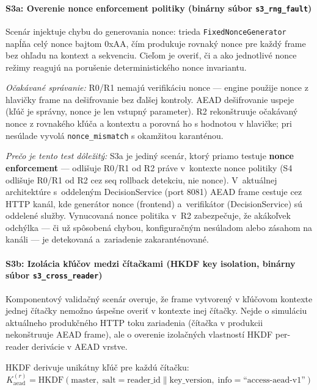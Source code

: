 \paragraph{S3a: Overenie nonce enforcement politiky (binárny súbor \texttt{s3\_rng\_fault})}

Scenár injektuje chybu do generovania nonce: trieda \texttt{FixedNonceGenerator} napĺňa celý nonce bajtom 0xAA, čím produkuje rovnaký nonce pre každý frame bez ohľadu na kontext a sekvenciu. Cieľom je overiť, či a ako jednotlivé nonce režimy reagujú na porušenie deterministického nonce invariantu.

\textit{Očakávané správanie:} R0/R1 nemajú verifikáciu nonce --- engine použije nonce z hlavičky frame na dešifrovanie bez ďalšej kontroly. AEAD dešifrovanie uspeje (kľúč je správny, nonce je len vstupný parameter). R2 rekonštruuje očakávaný nonce z rovnakého kľúča a kontextu a porovná ho s hodnotou v hlavičke; pri nesúlade vyvolá \texttt{nonce\_mismatch} s okamžitou karanténou.

\textit{Prečo je tento test dôležitý:} S3a je jediný scenár, ktorý priamo testuje \textbf{nonce enforcement} --- odlišuje R0/R1 od R2 práve v~kontexte nonce politiky (S4 odlišuje R0/R1 od R2 cez seq rollback detekciu, nie nonce). V~aktuálnej architektúre s~oddeleným DecisionService (port 8081) AEAD frame cestuje cez HTTP kanál, kde generátor nonce (frontend) a~verifikátor (DecisionService) sú oddelené služby. Vynucovaná nonce politika v~R2 zabezpečuje, že akákoľvek odchýlka --- či už spôsobená chybou, konfiguračným nesúladom alebo zásahom na kanáli --- je detekovaná a~zariadenie zakaranténované\cite{RogawayNonceMisuse2004}.

\paragraph{S3b: Izolácia kľúčov medzi čítačkami (HKDF key isolation, binárny súbor \texttt{s3\_cross\_reader})}

Komponentový validačný scenár overuje, že frame vytvorený v kľúčovom kontexte jednej čítačky nemožno úspešne overiť v kontexte inej čítačky. Nejde o simuláciu aktuálneho produkčného HTTP toku zariadenia (čítačka v produkcii nekonštruuje AEAD frame), ale o overenie izolačných vlastností HKDF per-reader derivácie v AEAD vrstve.

HKDF\cite{RFC5869} derivuje unikátny kľúč pre každú čítačku:
\begin{equation}
K_{\text{aead}}^{(r)} = \text{HKDF}(\text{master}, \; \text{salt}=\text{reader\_id} \| \text{key\_version}, \; \text{info}=\text{``access-aead-v1''})
\end{equation}

